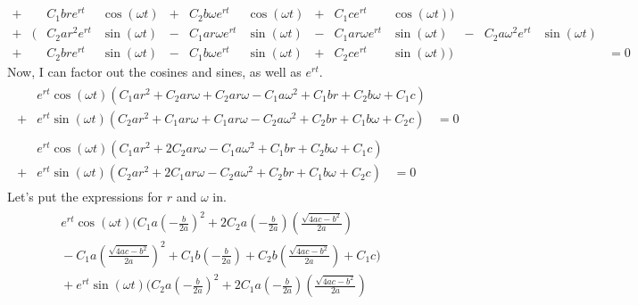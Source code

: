 \documentclass[11pt]{article}
\begin{document}
\begin{enumerate}[label={\textbf{\arabic*.}}]
{\begin{enumerate}[label={\textbf{(\alph*)}}]
{\begin{equation*}
\begin{alignedat}{7}
                            {}+{}&&C_1bre^{rt}&\cos(\omega t)&{}+{}&C_2b\omega e^{rt}&\cos(\omega t)&{}+{}&C_1ce^{rt}&\cos(\omega t)) \\
                            {}+{}&(&C_2ar^2e^{rt}&\sin(\omega t)&{}-{}&C_1ar\omega e^{rt}&\sin(\omega t)&{}-{}&C_1ar\omega e^{rt}&\sin(\omega t)&{}-{}&C_2a\omega^2e^{rt}&\sin(\omega t) \\
                            {}+{}&&C_2bre^{rt}&\sin(\omega t)&{}-{}&C_1b\omega e^{rt}&\sin(\omega t)&{}+{}&C_2ce^{rt}&\sin(\omega t))&&&&=0
                        \end{alignedat}
                    \end{equation*}
                    Now, I can factor out the cosines and sines, as well as $e^{rt}$.
                    \begin{align*}
                        \begin{alignedat}{2}
                            &e^{rt}\cos(\omega t)(C_1ar^2+C_2ar\omega+C_2ar\omega-C_1a\omega^2+C_1br+C_2b\omega+C_1c)& \\
                            {}+{}&e^{rt}\sin(\omega t)(C_2ar^2+C_1ar\omega+C_1ar\omega-C_2a\omega^2+C_2br+C_1b\omega+C_2c)&{}=0
                        \end{alignedat} \\[8pt]
                        \begin{alignedat}{2}
                            &e^{rt}\cos(\omega t)(C_1ar^2+2C_2ar\omega-C_1a\omega^2+C_1br+C_2b\omega+C_1c)& \\
                            {}+{}&e^{rt}\sin(\omega t)(C_2ar^2+2C_1ar\omega-C_2a\omega^2+C_2br+C_1b\omega+C_2c)&{}=0
                        \end{alignedat}
                    \end{align*}
                    Let's put the expressions for $r$ and $\omega$ in.
                    \begin{align*}
                        \begin{split}
                            e^{rt}\cos(\omega t)\bigg(C_1a\left(-\tfrac{b}{2a}\right)^2+2C_2a\left(-\tfrac{b}{2a}\right)\left(\tfrac{\sqrt{4ac-b^2}}{2a}\right)\qquad&\\
                            {}-C_1a\left(\tfrac{\sqrt{4ac-b^2}}{2a}\right)^2+C_1b\left(-\tfrac{b}{2a}\right)+C_2b\left(\tfrac{\sqrt{4ac-b^2}}{2a}\right)+C_1c\bigg)\quad& \\
                            {}+e^{rt}\sin(\omega t)\bigg(C_2a\left(-\tfrac{b}{2a}\right)^2{}+2C_1a\left(-\tfrac{b}{2a}\right)\left(\tfrac{\sqrt{4ac-b^2}}{2a}\right)\qquad&\\

\end{split}
\end{align*}}
\end{enumerate}}
\end{enumerate}
\end{document}
